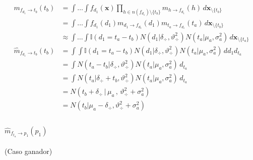 \documentclass[11pt,twoside,spanish]{report} %
\begin{document}
\begin{equation}\label{eq:^m_fd_tb}
	\begin{split}
		m_{f_{d_1} \rightarrow t_b}(t_b) & = \int \dots \int f_{d_1}(\textbf{x}) \prod_{h \in n(f_{d_1}) \setminus \{t_b\} } m_{h \rightarrow f_{d_1}}(h) \, d\textbf{x}_{\setminus \{t_b\}} \\
		& = \int \dots \int f_{d_1}(d_1)  m_{d_1 \rightarrow f_{d_1}}(d_1) m_{t_a \rightarrow f_{d_1}}(t_a) \, d\textbf{x}_{\setminus \{t_b\}} \\
		&\approx  \int \dots \int \mathbb{I}(d_1 = t_a - t_b) N(d_1 | \delta_{\div}, \vartheta_{\div}^2) N(t_a | \mu_a , \sigma_a^2 )  \, d\textbf{x}_{\setminus \{t_a\} } \\
		\widehat{m}_{f_{d_1} \rightarrow t_b}(t_b)  & = \int \int \mathbb{I}(d_1 = t_a - t_b) N(d_1 | \delta_{\div}, \vartheta_{\div}^2) N(t_a | \mu_a , \sigma_a^2 )  \, d{d_1} d_{t_a} \\
		& =\int  N(t_a - t_b | \delta_{\div}, \vartheta_{\div}^2) N(t_a | \mu_a , \sigma_a^2 )  \, d_{t_a} \\
		& = \int  N( t_a | \delta_{\div} + t_b, \vartheta_{\div}^2) N(t_a | \mu_a , \sigma_a^2 )  \, d_{t_a} \\
		& = N(t_b + \delta_{\div} \, | \, \mu_a \, , \, \vartheta_{\div}^2 + \sigma_a^2) \\
		& = N(t_b | \mu_a - \delta_{\div}  ,  \vartheta_{\div}^2 + \sigma_a^2) \\
	\end{split}
\end{equation}

\paragraph{$\widehat{m}_{f_{t_a} \rightarrow p_1}(p_1)$} (Caso ganador)
\end{document}
